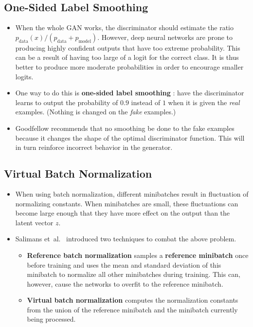 \documentclass[10pt]{article}
\newcommand{\etal}{{et~al.}}
\begin{document}
  \subsection{One-Sided Label Smoothing}

  \begin{itemize}
    \item When the whole GAN works, the discriminator should estimate the ratio $p_{\mathrm{data}}(x)/(p_{\mathrm{data}} + p_{\mathrm{model}})$. However, deep neural networks are prone to producing highly confident outputs that have too extreme probability. This can be a result of having too large of a logit for the correct class. It is thus better to produce more moderate probabilities in order to encourage smaller logits.

    \item One way to do this is \textbf{one-sided label smoothing} \cite{Salimans:2016}: have the discriminator learns to output the probability of $0.9$ instead of $1$ when it is given the \emph{real} examples. (Nothing is changed on the \emph{fake} examples.)

    \item Goodfellow recommends that no smoothing be done to the fake examples \cite{Goodfellow:2016} because it changes the shape of the optimal discriminator function. This will in turn reinforce incorrect behavior in the generator.
  \end{itemize}

  \subsection{Virtual Batch Normalization}

  \begin{itemize}
    \item When using batch normalization, different minibatches result in fluctuation of normalizing constants. When minibatches are small, these fluctuations can become large enough that they have more effect on the output than the latent vector $z$.

    \item Salimans \etal\ \cite{Salimans:2016} introduced two techniques to combat the above problem.

    \begin{itemize}
      \item \textbf{Reference batch normalization} samples a \textbf{reference minibatch} once before training and uses the mean and standard deviation of this minibatch to normalize all other minibatches during training. This can, however, cause the networks to overfit to the reference minibatch.

      \item \textbf{Virtual batch normalization} computes the normalization constants from the union of the reference minibatch and the minibatch currently being processed.
    \end{itemize}
  \end{itemize}
\end{document}
